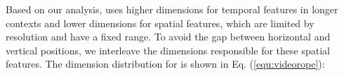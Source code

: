 Based on our analysis, \methodname uses higher dimensions for temporal features in longer contexts and lower dimensions for spatial features, which are limited by resolution and have a fixed range.
To avoid the gap between horizontal and vertical positions, we interleave the dimensions responsible for these spatial features.
The dimension distribution for \methodname is shown in Eq. (\ref{equ:videorope}):


